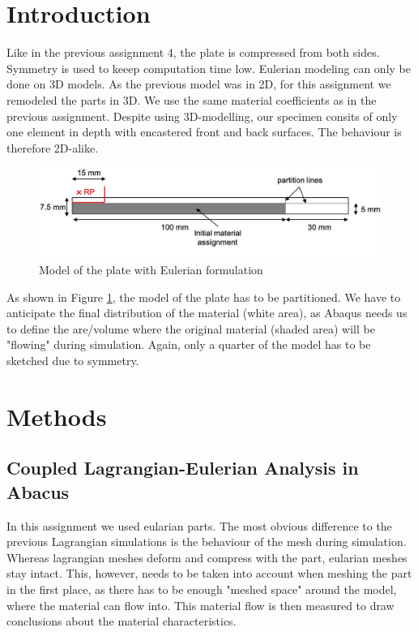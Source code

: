 \documentclass[12pt]{article}
\begin{document}
\section{Introduction}
Like in the previous assignment 4, the plate is compressed from both sides. Symmetry is used to keeep
computation time low. 
Eulerian modeling can only be done on 3D models. As the previous model was in 2D, 
for this assignment we remodeled the parts in 3D. We use the same material coefficients
as in the previous assignment. 
Despite using 3D-modelling, our specimen consits of only one element in depth
with encastered front and back surfaces. The behaviour is therefore
2D-alike.

\begin{figure}[!htb]
  \centering
  \includegraphics[width=1.0\linewidth]{pics/shematics}
  \caption{Model of the plate with Eulerian formulation}
  \label{fig:1}
\end{figure}

\noindent As shown in Figure \ref{fig:1}, the model of the plate has to be partitioned. 
We have to anticipate the final distribution of the material (white area), as Abaqus needs us to define the are/volume 
where the original material (shaded area) will be "flowing" during simulation. 
Again, only a quarter of the model has to be sketched due to symmetry.

\newpage
\section{Methods}

\subsection{Coupled Lagrangian-Eulerian Analysis in Abacus}

In this assignment we used eularian parts. The most obvious difference to the previous Lagrangian
simulations is the behaviour of the mesh during simulation. Whereas lagrangian meshes deform and compress 
with the part, eularian meshes stay intact. This, however, needs to be taken into account 
when meshing the part in the first place, as there has to be enough "meshed space" around the model,
where the material can flow into. This material flow is then measured to draw conclusions
about the material characteristics.
\end{document}
